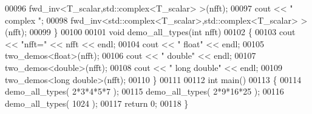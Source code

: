\begin{DoxyCode}
00096     fwd\_inv<T\_scalar,std::complex<T\_scalar> >(nfft);
00097     cout << \textcolor{stringliteral}{"    complex "};
00098     fwd\_inv<std::complex<T\_scalar>,std::complex<T\_scalar> >(nfft);
00099 \}
00100 
00101 \textcolor{keywordtype}{void} demo\_all\_types(\textcolor{keywordtype}{int} nfft)
00102 \{
00103     cout << \textcolor{stringliteral}{"nfft="} << nfft << endl;
00104     cout << \textcolor{stringliteral}{"   float"} << endl;
00105     two\_demos<float>(nfft);
00106     cout << \textcolor{stringliteral}{"   double"} << endl;
00107     two\_demos<double>(nfft);
00108     cout << \textcolor{stringliteral}{"   long double"} << endl;
00109     two\_demos<long double>(nfft);
00110 \}
00111 
00112 \textcolor{keywordtype}{int} main()
00113 \{
00114     demo\_all\_types( 2*3*4*5*7 );
00115     demo\_all\_types( 2*9*16*25 );
00116     demo\_all\_types( 1024 );
00117     \textcolor{keywordflow}{return} 0;
00118 \}
\end{DoxyCode}
